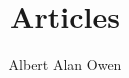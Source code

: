 \documentclass{combine}
\author{Albert Alan Owen}
\title{Articles}
\date{}
\begin{document}
\maketitle

\begin{papers}
    
    
    
    
\end{papers}
\end{document}
